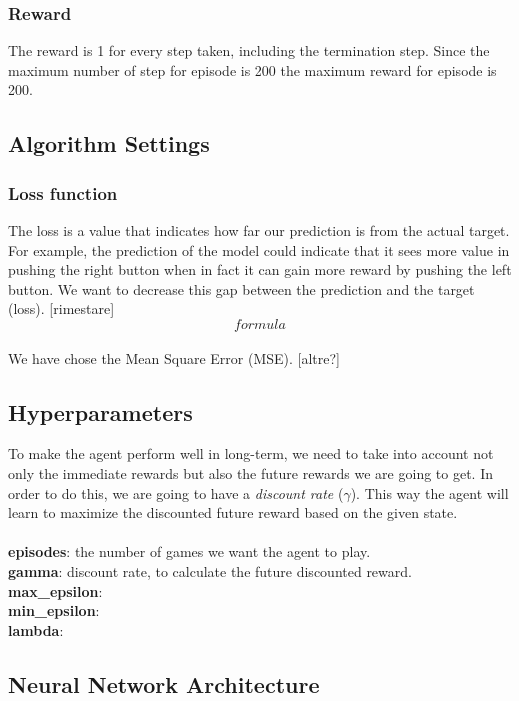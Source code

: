 \subsubsection{Reward}
The reward is 1 for every step taken, including the termination step. Since the maximum number of step for episode is 200 the maximum reward for episode is 200.


\subsection{Algorithm Settings}

\subsubsection{Loss function}

The loss is a value that indicates how far our prediction is from the actual target. For example, the prediction of the model could indicate that it sees more value in pushing the right button when in fact it can gain more reward by pushing the left button. We want to decrease this gap between the prediction and the target (loss).
[rimestare]
\\
\[formula\]
\\We have chose the Mean Square Error (MSE).
[altre?]

\subsection{Hyperparameters}

To make the agent perform well in long-term, we need to take into account not only the immediate rewards but also the future rewards we are going to get. In order to do this, we are going to have a \textit{discount rate} ($\gamma$). This way the agent will learn to maximize the discounted future reward based on the given state.
\\\\\textbf{episodes}: the number of games we want the agent to play.
\\\textbf{gamma}: discount rate, to calculate the future discounted reward.
\\\textbf{max\_epsilon}:
\\\textbf{min\_epsilon}:
\\\textbf{lambda}:


\subsection{Neural Network Architecture}

